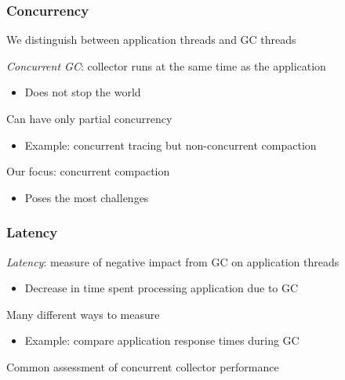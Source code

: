 \documentclass{beamer}
\newcommand{\linespace}{\vskip 0.25cm}
\begin{document}
\begin{frame}

\frametitle{Concurrency}

We distinguish between application threads and GC threads

\linespace
\linespace

\emph{Concurrent GC}: collector runs at the same time as the application
\begin{itemize}
\item Does not stop the world
\end{itemize}

\linespace
\linespace

Can have only partial concurrency
\begin{itemize}
\item Example: concurrent tracing but non-concurrent compaction
\end{itemize}

\linespace
\linespace

Our focus: concurrent compaction
\begin{itemize}
\item Poses the most challenges
\end{itemize}

\end{frame}

\begin{frame}

\frametitle{Latency}

\emph{Latency}: measure of negative impact from GC on application threads
\begin{itemize}
\item Decrease in time spent processing application due to GC
\end{itemize}

\linespace
\linespace

Many different ways to measure
\begin{itemize}
\item Example: compare application response times during GC %
\end{itemize}

\linespace
\linespace

Common assessment of concurrent collector performance

\end{frame}
\end{document}

